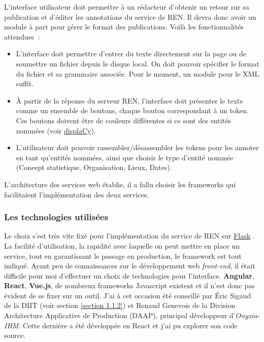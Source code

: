 L'interface utilisateur doit permettre à un rédacteur d'obtenir un retour sur sa publication et d'éditer les annotations du service de REN. Il devra donc avoir un module à part pour gérer le format des publications. Voilà les fonctionnalités attendues~:
\vspace{5pt}
\begin{itemize}
    \item L'interface doit permettre d'entrer du texte directement sur la page ou de soumettre un fichier depuis le disque local. On doit pouvoir spécifier le format du fichier et sa grammaire associée. Pour le moment, un module pour le XML suffit.
    \vspace{5pt}
    \item À partir de la réponse du serveur REN, l'interface doit présenter le texte comme un ensemble de boutons, chaque bouton correspondant à un token. Ces boutons doivent être de couleurs différentes si ce sont des entités nommées (voir \href{https://spacy.io/usage/visualizers#ent}{displaCy}\cite{displacy}).
    \vspace{5pt}
    \item L'utilisateur doit pouvoir rassembler/désassembler les tokens pour les annoter en tant qu'entités nommées, ainsi que choisir le type d'entité nommée (Concept statistique, Organisation, Lieux, Dates).
    \newline
\end{itemize}

L'architecture des services web établie, il a fallu choisir les frameworks qui facilitaient l'implémentation des deux services.
\label{section 3.2.1 - Architecture des services}

\subsubsection{Les technologies utilisées}
Le choix s'est très vite fixé pour l'implémentation du service de REN sur \href{https://github.com/pallets/flask}{Flask} \cite{flask}. La facilité d'utilisation, la rapidité avec laquelle on peut mettre en place un service, tout en garantissant le passage en production, le framework est tout indiqué. Ayant peu de connaissances sur le développement web \textit{front-end}, il était difficile pour moi d'effectuer un choix de technologies pour l'interface. \textbf{Angular}, \textbf{React}, \textbf{Vue.js}, de nombreux frameworks Javascript existent et il n'est donc pas évident de se fixer sur un outil. J'ai à cet occasion été conseillé par Éric Sigaud de la DIIT (voir section \ref{section 1.1.2}) et Renaud Genevois de la Division Architecture Applicative de Production (DAAP), principal développeur d'\textit{Onyxia-IHM}. Cette dernière a été développée en React et j'ai pu explorer son code source.
\label{section 3.2.2}


